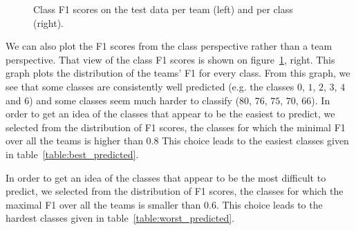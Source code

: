 \documentclass{article}
\begin{document}
\begin{figure}
	\begin{center}
		\hspace*{.4in}
	\end{center}
	\caption{\label{fig:class_f1_scores} Class F1 scores on the test data per team (left) and per class (right).}
\end{figure}

We can also plot the F1 scores from the class perspective rather than a team perspective. That view of the class F1 scores is shown on figure~\ref{fig:class_f1_scores}, right. This graph plots the distribution of the teams' F1 for every class. From this graph, we see that some classes are consistently well predicted (e.g. the classes $0$, $1$, $2$, $3$, $4$ and $6$) and some classes seem much harder to classify ($80$, $76$, $75$, $70$, $66$). In order to get an idea of the classes that appear to be the easiest to predict, we selected from the distribution of F1 scores, the classes for which the minimal F1 over all the teams is higher than 0.8 This choice leads to the easiest classes given in table~\ref{table:best_predicted}.



In order to get an idea of the classes that appear to be the most difficult to predict, we selected from the distribution of F1 scores, the classes for which the maximal F1 over all the teams is smaller than 0.6. This choice leads to the hardest classes given in table~\ref{table:worst_predicted}.
\end{document}
